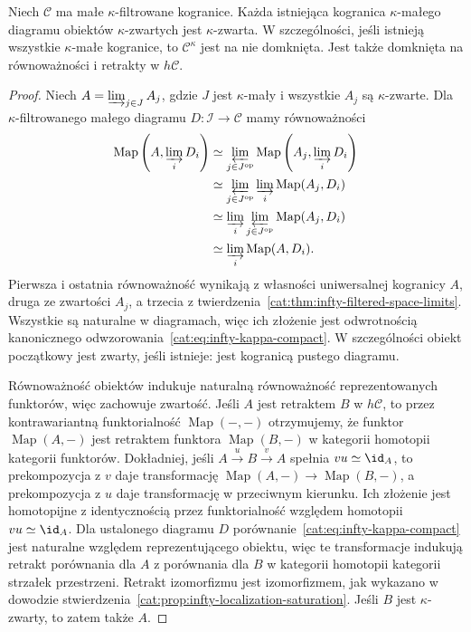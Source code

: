 \begin{stwierdzenie}\label{cat:prop:infty-kappa-compact-closure}
Niech $\mathcal C$ ma małe $\kappa$-filtrowane kogranice. Każda istniejąca kogranica $\kappa$-małego diagramu obiektów $\kappa$-zwartych jest $\kappa$-zwarta. W szczególności, jeśli istnieją wszystkie $\kappa$-małe kogranice, to $\mathcal C^\kappa$ jest na nie domknięta. Jest także domknięta na równoważności i retrakty w $h\mathcal C$.
\end{stwierdzenie}
\begin{proof}
Niech $A=\varinjlim_{j\in J}A_j$, gdzie $J$ jest $\kappa$-mały i wszystkie $A_j$ są $\kappa$-zwarte. Dla $\kappa$-filtrowanego małego diagramu $D:\mathcal I\to\mathcal C$ mamy równoważności
\[
\begin{aligned}
 \operatorname{Map}\left(A,\varinjlim_iD_i\right)
 &\simeq\varprojlim_{j\in J^{\mathrm{op}}}\operatorname{Map}\left(A_j,\varinjlim_iD_i\right)\\
 &\simeq\varprojlim_{j\in J^{\mathrm{op}}}\varinjlim_i\operatorname{Map}(A_j,D_i)\\
 &\simeq\varinjlim_i\varprojlim_{j\in J^{\mathrm{op}}}\operatorname{Map}(A_j,D_i)\\
 &\simeq\varinjlim_i\operatorname{Map}(A,D_i).
\end{aligned}
\]
Pierwsza i ostatnia równoważność wynikają z własności uniwersalnej kogranicy $A$, druga ze zwartości $A_j$, a trzecia z twierdzenia~\ref{cat:thm:infty-filtered-space-limits}. Wszystkie są naturalne w diagramach, więc ich złożenie jest odwrotnością kanonicznego odwzorowania~\eqref{cat:eq:infty-kappa-compact}. W szczególności obiekt początkowy jest zwarty, jeśli istnieje: jest kogranicą pustego diagramu.

Równoważność obiektów indukuje naturalną równoważność reprezentowanych funktorów, więc zachowuje zwartość. Jeśli $A$ jest retraktem $B$ w $h\mathcal C$, to przez kontrawariantną funktorialność $\operatorname{Map}(-,-)$ otrzymujemy, że funktor $\operatorname{Map}(A,-)$ jest retraktem funktora $\operatorname{Map}(B,-)$ w kategorii homotopii kategorii funktorów. Dokładniej, jeśli $A\xrightarrow{u}B\xrightarrow{v}A$ spełnia $vu\simeq\id_A$, to prekompozycja z $v$ daje transformację $\operatorname{Map}(A,-)\to\operatorname{Map}(B,-)$, a prekompozycja z $u$ daje transformację w przeciwnym kierunku. Ich złożenie jest homotopijne z identycznością przez funktorialność względem homotopii $vu\simeq\id_A$. Dla ustalonego diagramu $D$ porównanie~\eqref{cat:eq:infty-kappa-compact} jest naturalne względem reprezentującego obiektu, więc te transformacje indukują retrakt porównania dla $A$ z porównania dla $B$ w kategorii homotopii kategorii strzałek przestrzeni. Retrakt izomorfizmu jest izomorfizmem, jak wykazano w dowodzie stwierdzenia~\ref{cat:prop:infty-localization-saturation}. Jeśli $B$ jest $\kappa$-zwarty, to zatem także $A$.
\end{proof}

